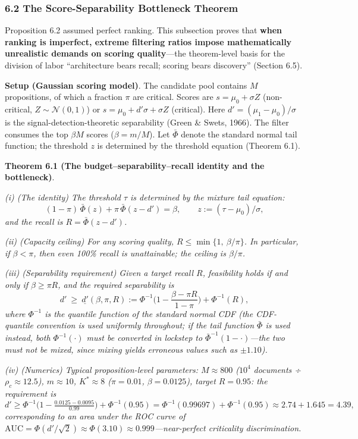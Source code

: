 \documentclass[
  11pt]{article}
\begin{document}
\subsubsection{6.2 The Score-Separability Bottleneck
Theorem}\label{the-score-separability-bottleneck-theorem}

Proposition 6.2 assumed perfect ranking. This subsection proves that
\textbf{when ranking is imperfect, extreme filtering ratios impose
mathematically unrealistic demands on scoring quality}---the
theorem-level basis for the division of labor ``architecture bears
recall; scoring bears discovery'' (Section 6.5).

\textbf{Setup (Gaussian scoring model)}. The candidate pool contains
\(M\) propositions, of which a fraction \(\pi\) are critical. Scores are
\(s = \mu_0 + \sigma Z\) (non-critical, \(Z \sim \mathcal{N}(0,1)\)) or
\(s = \mu_0 + d'\sigma + \sigma Z\) (critical). Here
\(d' = (\mu_1 - \mu_0)/\sigma\) is the signal-detection-theoretic
separability (Green \& Swets, 1966). The filter consumes the top
\(\beta M\) scores (\(\beta = m/M\)). Let \(\bar\Phi\) denote the
standard normal tail function; the threshold \(z\) is determined by the
threshold equation (Theorem 6.1).

\textbf{Theorem 6.1 (The budget--separability--recall identity and the
bottleneck)}.

\emph{(i) (The identity) The threshold \(\tau\) is determined by the
mixture tail equation:}
\[(1-\pi)\,\bar\Phi(z) + \pi\, \bar\Phi(z - d') = \beta, \qquad z := (\tau - \mu_0)/\sigma,\]
\emph{and the recall is \(R = \bar\Phi(z - d')\).}

\emph{(ii) (Capacity ceiling) For any scoring quality,
\(R \le \min\{1,\ \beta/\pi\}\). In particular, if \(\beta < \pi\), then
even 100\% recall is unattainable; the ceiling is \(\beta/\pi\).}

\emph{(iii) (Separability requirement) Given a target recall \(R\),
feasibility holds if and only if \(\beta \ge \pi R\), and the required
separability is}
\[d' \ \ge\ \underline{d'}(\beta, \pi, R) := \Phi^{-1}\Big(1-\frac{\beta - \pi R}{1 - \pi}\Big) + \Phi^{-1}(R),\]
\emph{where \(\Phi^{-1}\) is the quantile function of the standard
normal CDF (the CDF-quantile convention is used uniformly throughout; if
the tail function \(\bar\Phi\) is used instead, both
\(\Phi^{-1}(\cdot)\) must be converted in lockstep to
\(\bar\Phi^{-1}(1-\cdot)\)---the two must not be mixed, since mixing
yields erroneous values such as \(\pm1.10\)).}

\emph{(iv) (Numerics) Typical proposition-level parameters:
\(M \approx 800\) (\(10^4\) documents ÷ \(\rho_c \approx 12.5\)),
\(m \approx 10\), \(K^* \approx 8\) (\(\pi = 0.01\),
\(\beta = 0.0125\)), target \(R = 0.95\): the requirement is}
\[d' \ge \Phi^{-1}\big(1-\tfrac{0.0125 - 0.0095}{0.99}\big) + \Phi^{-1}(0.95) = \Phi^{-1}(0.99697) + \Phi^{-1}(0.95) \approx 2.74 + 1.645 = 4.39,\]
\emph{corresponding to an area under the ROC curve of
\(\mathrm{AUC} = \Phi(d'/\sqrt2) \approx \Phi(3.10) \approx 0.999\)---near-perfect
criticality discrimination.}
\end{document}
